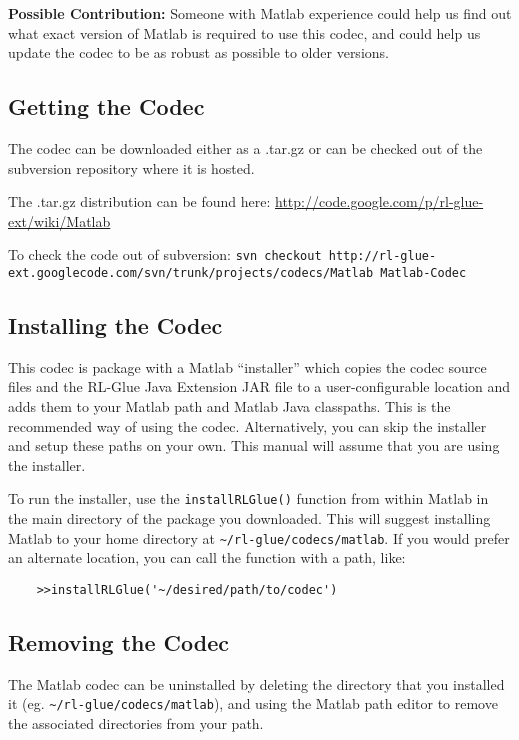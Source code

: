 \documentclass[11pt]{article}
\begin{document}
\textbf{Possible Contribution: }Someone with Matlab experience could help us find out what exact version of Matlab is required to use this codec, and could help us update the codec to be as robust as possible to older versions.

\subsection{Getting the Codec}
The codec can be downloaded either as a .tar.gz or can be checked out of the subversion repository where it is hosted.

The .tar.gz distribution can be found here:\newline
\url{http://code.google.com/p/rl-glue-ext/wiki/Matlab}


To check the code out of subversion:\newline
\small \texttt{svn checkout http://rl-glue-ext.googlecode.com/svn/trunk/projects/codecs/Matlab Matlab-Codec} \normalsize

\subsection{Installing the Codec}
This codec is package with a Matlab ``installer'' which copies the codec source files and the RL-Glue Java Extension JAR file to a user-configurable location and adds them to your Matlab path and Matlab Java classpaths.  This is the recommended way of using the codec.  Alternatively, you can skip the installer and setup these paths on your own.   This manual will assume that you are using the installer.

To run the installer, use the \texttt{installRLGlue()} function from within Matlab in the main directory of the package you downloaded.  This will suggest installing Matlab to your home directory at \texttt{\~{}/rl-glue/codecs/matlab}.  If you would prefer an alternate location, you can call the function with a path, like:
\begin{verbatim}
	>>installRLGlue('~/desired/path/to/codec')
\end{verbatim}

\subsection{Removing the Codec}
The Matlab codec can be uninstalled by deleting the directory that you installed it \newline(eg. \texttt{\~{}/rl-glue/codecs/matlab}), and using the Matlab path editor to remove the associated directories from your path.
\end{document}
